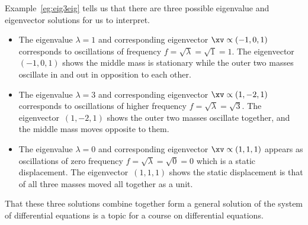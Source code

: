 \begin{example}
Example~\ref{eg:eig3eig} tells us that there are three possible eigenvalue and eigenvector solutions for us to interpret.
\begin{itemize}
\item The eigenvalue \(\lambda=1\) and corresponding eigenvector \(\xv\propto(-1,0,1)\) corresponds to oscillations of frequency \(f=\sqrt\lambda=\sqrt 1=1\).
The eigenvector~\((-1,0,1)\) shows the middle mass is stationary while the outer two masses oscillate in and out in opposition to each other.
\item The eigenvalue \(\lambda=3\) and corresponding eigenvector \(\xv\propto(1,-2,1)\) corresponds to oscillations of higher frequency \(f=\sqrt\lambda=\sqrt 3\).
The eigenvector~\((1,-2,1)\) shows the outer two masses oscillate together, and the middle mass moves opposite to them.
\item The eigenvalue \(\lambda=0\) and corresponding eigenvector \(\xv\propto(1,1,1)\) appears as oscillations of zero frequency \(f=\sqrt\lambda=\sqrt 0=0\) which is a static displacement.
The eigenvector~\((1,1,1)\) shows the static displacement is that of all three masses moved all together as a unit.
\end{itemize}
That these three solutions combine together form a general solution of the system of differential equations is a topic for a course on differential equations.
\end{example}




